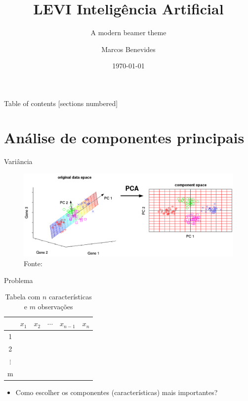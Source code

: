\documentclass{beamer}
\title{LEVI \- Inteligência Artificial}
\subtitle{A modern beamer theme}
\date{\today}
\author{Marcos Benevides}
\institute{Universidade Federal do Maranhão}
\theoremstyle{definition}
\begin{document}
\maketitle

\begin{frame}{Table of contents}
  [sections numbered]
  \tableofcontents%
\end{frame}

\section{Análise de componentes principais}

\begin{frame}{Variância}
  \begin{figure}[t]
    \includegraphics[width=\textwidth]{pca.png}
    \caption{Fonte: \cite{scholz2006approaches}}
    \centering
  \end{figure}
\end{frame}

\begin{frame}{Problema}

  \begin{table}
    \centering
    \begin{tabular}{ |c|c|c|c|c|c| }
    \hline
    & $x_1$ & $x_2$ & $\cdots$ & $x_{n-1}$ & $x_{n}$ \\ 
    \hline
    1 & & & & & \\ 
    \hline
    2 & & & & & \\ 
    \hline
    $\vdots$ & & & & & \\ 
    \hline
    m & & & & & \\ 
    \hline
    \end{tabular}
    \caption{Tabela com $n$ características e $m$ observações}
  \end{table}

  \begin{itemize}
    \item Como escolher os componentes (características) mais importantes?
  \end{itemize}

\end{frame}
\end{document}
